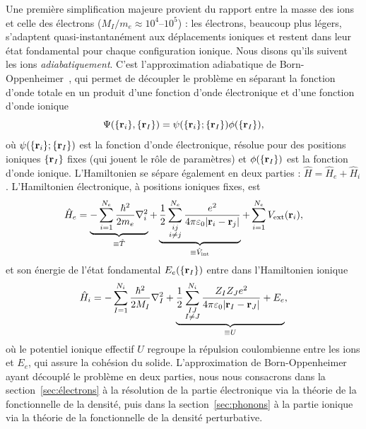 Une première simplification majeure provient du rapport entre la masse des ions et celle des électrons ($M_I/m_e \approx 10^4$--$10^5$) : les électrons, beaucoup plus légers, s'adaptent quasi-instantanément aux déplacements ioniques et restent dans leur état fondamental pour chaque configuration ionique. Nous disons qu'ils suivent les ions \textit{adiabatiquement}. C'est l'approximation adiabatique de Born-Oppenheimer~\cite{bornZurQuantentheorieMolekeln1927}, qui permet de découpler le problème en séparant la fonction d'onde totale en un produit d'une fonction d'onde électronique et d'une fonction d'onde ionique
\begin{equation}
    \Psi(\{\mathbf{r}_i\},\{\mathbf{r}_I\})=\psi(\{\mathbf{r}_i\};\{\mathbf{r}_I\})\phi(\{\mathbf{r}_I\}),
    \label{eqn:c2_BO}
\end{equation}
où $\psi(\{\mathbf{r}_i\};\{\mathbf{r}_I\})$ est la fonction d'onde électronique, résolue pour des positions ioniques $\{\mathbf{r}_I\}$ fixes (qui jouent le rôle de paramètres) et $\phi(\{\mathbf{r}_I\})$ est la fonction d'onde ionique. L'Hamiltonien se sépare également en deux parties : $\hat{H}=\hat{H}_e+\hat{H}_i$. L'Hamiltonien électronique, à positions ioniques fixes, est
\begin{equation}
    \hat{H}_e=\underbrace{-\sum_{i=1}^{N_e}\frac{\hbar^2}{2m_e}\nabla_i^2}_{\equiv \hat{T}}+\underbrace{\frac{1}{2}\sum_{\substack{ij \\ i\neq j}}^{N_e}\frac{e^2}{4\pi\varepsilon_0|\mathbf{r}_i-\mathbf{r}_j|}}_{\equiv \hat{V}_\text{int}}+\sum_{i=1}^{N_e}V_\text{ext}(\mathbf{r}_i),
    \label{eqn:c2_He}
\end{equation}
et son énergie de l'état fondamental $E_e(\{\mathbf{r}_I\})$ entre dans l'Hamiltonien ionique
\begin{equation}
    \hat{H}_i = -\sum_{I=1}^{N_i}\frac{\hbar^2}{2M_I}\nabla_I^2+\underbrace{\frac{1}{2}\sum_{\substack{IJ \\ I\neq J}}^{N_i}\frac{Z_IZ_Je^2}{4\pi\varepsilon_0|\mathbf{r}_I-\mathbf{r}_J|}+E_e}_{\equiv U},
    \label{eqn:c2_Hi}
\end{equation}
où le potentiel ionique effectif $U$ regroupe la répulsion coulombienne entre les ions et $E_e$, qui assure la cohésion du solide. L'approximation de Born-Oppenheimer ayant découplé le problème en deux parties, nous nous consacrons dans la section~\ref{sec:électrons} à la résolution de la partie électronique via la théorie de la fonctionnelle de la densité, puis dans la section~\ref{sec:phonons} à la partie ionique via la théorie de la fonctionnelle de la densité perturbative.

